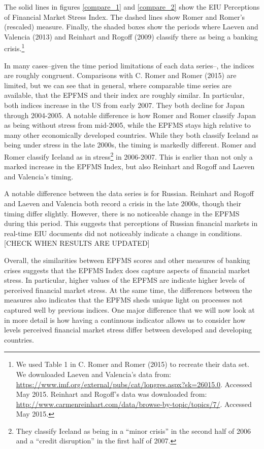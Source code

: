 \documentclass[]{article}
\let\rmarkdownfootnote\footnote%
\def\footnote{\protect\rmarkdownfootnote}
\begin{document}
The solid lines in figures \ref{compare_1} and \ref{compare_2} show the
EIU Perceptions of Financial Market Stress Index. The dashed lines show
Romer and Romer's (rescaled) measure. Finally, the shaded boxes show the
periods where Laeven and Valencia (2013) and Reinhart and Rogoff (2009)
classify there as being a banking crisis.\footnote{We used Table 1 in C.
  Romer and Romer (2015) to recreate their data set. We downloaded
  Laeven and Valencia's data from:
  \url{https://www.imf.org/external/pubs/cat/longres.aspx?sk=26015.0}.
  Accessed May 2015. Reinhart and Rogoff's data was downloaded from:
  \url{http://www.carmenreinhart.com/data/browse-by-topic/topics/7/}.
  Accessed May 2015.}

In many cases--given the time period limitations of each data series--,
the indices are roughly congruent. Comparisons with C. Romer and Romer
(2015) are limited, but we can see that in general, where comparable
time series are available, that the EPFMS and their index are roughly
similar. In particular, both indices increase in the US from early 2007.
They both decline for Japan through 2004-2005. A notable difference is
how Romer and Romer classify Japan as being without stress from
mid-2005, while the EPFMS stays high relative to many other economically
developed countries. While they both classify Iceland as being under
stress in the late 2000s, the timing is markedly different. Romer and
Romer classify Iceland as in stress\footnote{They classify Iceland as
  being in a ``minor crisis'' in the second half of 2006 and a ``credit
  disruption'' in the first half of 2007.} in 2006-2007. This is earlier
than not only a marked increase in the EPFMS Index, but also Reinhart
and Rogoff and Laeven and Valencia's timing.

A notable difference between the data series is for Russian. Reinhart
and Rogoff and Laeven and Valencia both record a crisis in the late
2000s, though their timing differ slightly. However, there is no
noticeable change in the EPFMS during this period. This suggests that
perceptions of Russian financial markets in real-time EIU documents did
not noticeably indicate a change in conditions. {[}CHECK WHEN RESULTS
ARE UPDATED{]}

Overall, the similarities between EPFMS scores and other measures of
banking crises suggests that the EPFMS Index does capture aspects of
financial market stress. In particular, higher values of the EPFMS are
indicate higher levels of perceived financial market stress. At the same
time, the differences between the measures also indicates that the EPFMS
sheds unique light on processes not captured well by previous indices.
One major difference that we will now look at in more detail is how
having a continuous indicator allows us to consider how levels perceived
financial market stress differ between developed and developing
countries.
\end{document}
